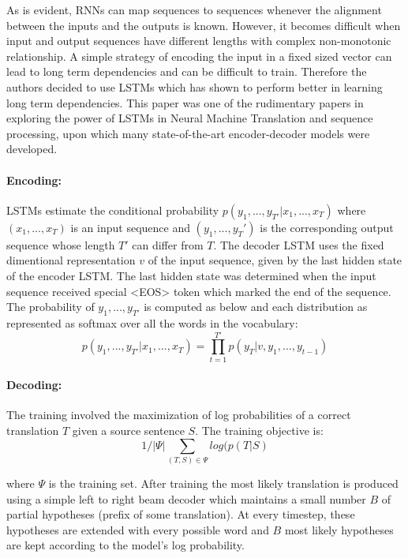 \documentclass{article}
\begin{document}
	As is evident, RNNs can map sequences to sequences whenever the alignment between the inputs and the outputs is known. However, it becomes difficult when input and output sequences have different lengths with complex non-monotonic relationship. A simple strategy of encoding the input in a fixed sized vector can lead to long term dependencies and can be difficult to train. Therefore the authors decided to use LSTMs which has shown to perform better in learning long term dependencies. This paper was one of the rudimentary papers in exploring the power of LSTMs in Neural Machine Translation and sequence processing, upon which many state-of-the-art encoder-decoder models were developed. 
	
	\paragraph{Encoding:} LSTMs estimate the conditional probability \(p(y_1, ..., y_{T'} | x_1, ..., x_T)\) where \((x_1, ..., x_T)\) is an input sequence and \((y_1, ..., y_T')\) is the corresponding output sequence whose length \(T'\) can differ from \(T\). The decoder LSTM uses the fixed dimentional representation \(v\) of the input sequence, given by the last hidden state of the encoder LSTM. The last hidden state was determined when the input sequence received special <EOS> token which marked the end of the sequence. The probability of \(y_1, ..., y_{T'}\) is computed as below and each distribution as represented as softmax over all the words in the vocabulary:
	\[p(y_1, ..., y_{T'} | x_1, ..., x_T) = \prod_{t=1}^{T'} p(y_{T} | v, y_1, ..., y_{t-1})\]
	
	\paragraph{Decoding:} The training involved the maximization of log probabilities of a correct translation \(T\) given a source sentence \(S\). The training objective is:
	\[1/|\Psi| \sum_{(T,S) \in \Psi} log(p(T|S)\]
	
	where \(\Psi\) is the training set. After training the most likely translation is produced using a simple left to right beam decoder which maintains a small number \(B\) of partial hypotheses (prefix of some translation). At every timestep, these hypotheses are extended with every possible word and \(B\) most likely hypotheses are kept according to the model's log probability. 
	
\end{document}

